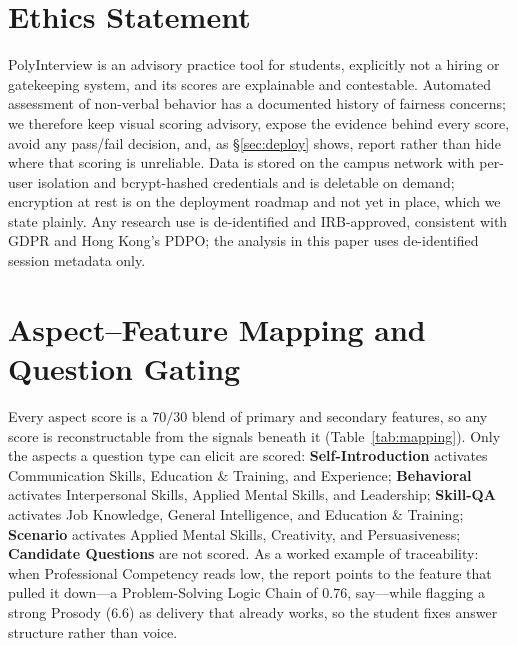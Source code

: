 \documentclass[11pt]{article}
\begin{document}
\section*{Ethics Statement}
PolyInterview is an advisory practice tool for students, explicitly not a hiring or gatekeeping system, and its scores are explainable and contestable. Automated assessment of non-verbal behavior has a documented history of fairness concerns; we therefore keep visual scoring advisory, expose the evidence behind every score, avoid any pass/fail decision, and, as \S\ref{sec:deploy} shows, report rather than hide where that scoring is unreliable. Data is stored on the campus network with per-user isolation and bcrypt-hashed credentials and is deletable on demand; encryption at rest is on the deployment roadmap and not yet in place, which we state plainly. Any research use is de-identified and IRB-approved, consistent with GDPR and Hong Kong's PDPO; the analysis in this paper uses de-identified session metadata only.



\appendix
\section{Aspect--Feature Mapping and Question Gating}
\label{app:mapping}
Every aspect score is a $70/30$ blend of primary and secondary features, so any score is reconstructable from the signals beneath it (Table~\ref{tab:mapping}). Only the aspects a question type can elicit are scored: \textbf{Self-Introduction} activates Communication Skills, Education \& Training, and Experience; \textbf{Behavioral} activates Interpersonal Skills, Applied Mental Skills, and Leadership; \textbf{Skill-QA} activates Job Knowledge, General Intelligence, and Education \& Training; \textbf{Scenario} activates Applied Mental Skills, Creativity, and Persuasiveness; \textbf{Candidate Questions} are not scored. As a worked example of traceability: when Professional Competency reads low, the report points to the feature that pulled it down---a Problem-Solving Logic Chain of $0.76$, say---while flagging a strong Prosody ($6.6$) as delivery that already works, so the student fixes answer structure rather than voice.
\end{document}
